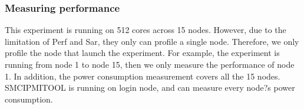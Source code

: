 \subsubsection{Measuring performance}
This experiment is running on 512 cores across 15 nodes. However, due to the limitation of Perf and Sar, they only can profile a single node. Therefore, we only profile the node that launch the experiment. For example, the experiment is running from node 1 to node 15, then we only measure the performance of node 1. In addition, the power consumption measurement covers all the 15 nodes. SMCIPMITOOL is running on login node, and can measure every node?s power consumption.








